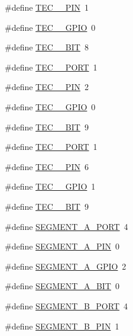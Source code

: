 \begin{DoxyCompactItemize}
\item 
\#define \hyperlink{group__hal_gae23ce57ac09e13a68a782d5bb61c8a30}{T\+E\+C\+\_\+\_\+\+P\+IN}~1
\item 
\#define \hyperlink{group__hal_ga83ce1f0ab51ee7b4df55e629cdfc52d9}{T\+E\+C\+\_\+\_\+\+G\+P\+IO}~0
\item 
\#define \hyperlink{group__hal_gaed7549a304721e36693036c8a289ff4c}{T\+E\+C\+\_\+\_\+\+B\+IT}~8
\item 
\#define \hyperlink{group__hal_gac948c6a2caf0ef5cde7fa2c2e94fddb0}{T\+E\+C\+\_\+\_\+\+P\+O\+RT}~1
\item 
\#define \hyperlink{group__hal_gab976c4177676c5c89497cb89480e5dfe}{T\+E\+C\+\_\+\_\+\+P\+IN}~2
\item 
\#define \hyperlink{group__hal_gae8728c8f2e4279383925ff93a183b407}{T\+E\+C\+\_\+\_\+\+G\+P\+IO}~0
\item 
\#define \hyperlink{group__hal_ga64392cf03fba776f8a9dc238e25ec184}{T\+E\+C\+\_\+\_\+\+B\+IT}~9
\item 
\#define \hyperlink{group__hal_gadd513c832f5c617281c5df0dc67ae80c}{T\+E\+C\+\_\+\_\+\+P\+O\+RT}~1
\item 
\#define \hyperlink{group__hal_ga0b2447cd531de479b88f58f819566522}{T\+E\+C\+\_\+\_\+\+P\+IN}~6
\item 
\#define \hyperlink{group__hal_gaa5418f15596d7ada110c4105aa70e561}{T\+E\+C\+\_\+\_\+\+G\+P\+IO}~1
\item 
\#define \hyperlink{group__hal_gac7c8a49f0602d0aeee33923ce8708a4b}{T\+E\+C\+\_\+\_\+\+B\+IT}~9
\item 
\#define \hyperlink{group__hal_ga500ad2ec21fb16f64978b7bd003a1bf6}{S\+E\+G\+M\+E\+N\+T\+\_\+\+A\+\_\+\+P\+O\+RT}~4
\item 
\#define \hyperlink{group__hal_ga7aedeb2e8eecb0ba677b642f01ca6bd7}{S\+E\+G\+M\+E\+N\+T\+\_\+\+A\+\_\+\+P\+IN}~0
\item 
\#define \hyperlink{group__hal_ga94921c1a8815dfa09a147c982270fe23}{S\+E\+G\+M\+E\+N\+T\+\_\+\+A\+\_\+\+G\+P\+IO}~2
\item 
\#define \hyperlink{group__hal_gad1a6375015ba7b66143a96b950b2846f}{S\+E\+G\+M\+E\+N\+T\+\_\+\+A\+\_\+\+B\+IT}~0
\item 
\#define \hyperlink{group__hal_ga82edaa1ab6e1175396b7819fc1a742a4}{S\+E\+G\+M\+E\+N\+T\+\_\+\+B\+\_\+\+P\+O\+RT}~4
\item 
\#define \hyperlink{group__hal_ga8f8be8bc112341bb891770762ab53b85}{S\+E\+G\+M\+E\+N\+T\+\_\+\+B\+\_\+\+P\+IN}~1
\item 

\end{DoxyCompactItemize}
